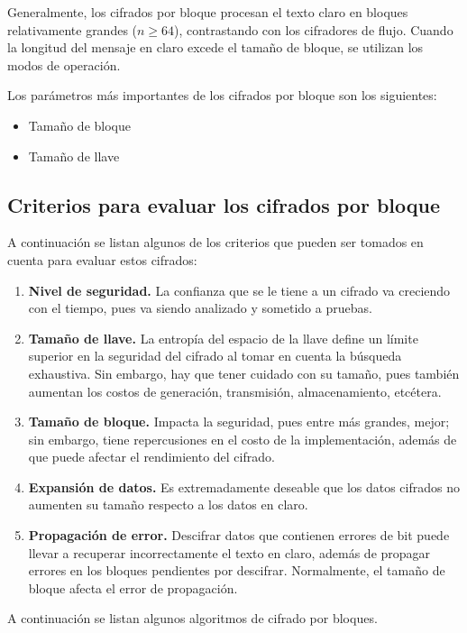 Generalmente, los cifrados por bloque procesan el texto claro en bloques
relativamente grandes ($n \geq 64$), contrastando con los cifradores de
flujo. Cuando la longitud del mensaje en claro excede el tamaño de
bloque, se utilizan los modos de operación.

Los parámetros más importantes de los cifrados por bloque son los
siguientes:
\begin{itemize}
	\item Tamaño de bloque
	\item Tamaño de llave
\end{itemize}

\subsection{Criterios para evaluar los cifrados por bloque}

A continuación se listan algunos de los criterios que pueden ser tomados en cuenta para evaluar estos cifrados:
\begin{enumerate}
	\item \textbf{Nivel de seguridad.} La confianza que se le tiene a un
		cifrado va creciendo con el tiempo, pues va siendo analizado y
		sometido a pruebas.
	\item \textbf{Tamaño de llave.} La entropía del espacio de la llave
		define un límite superior en la seguridad del cifrado al tomar en
		cuenta la búsqueda exhaustiva. Sin embargo, hay que tener cuidado
		con su tamaño, pues también aumentan los costos de generación,
		transmisión, almacenamiento, etcétera.
	\item \textbf{Tamaño de bloque.} Impacta la seguridad, pues entre más
		grandes, mejor; sin embargo, tiene repercusiones en el costo de la
		implementación, además de que puede afectar el rendimiento del
		cifrado.
	\item \textbf{Expansión de datos.} Es extremadamente deseable que los
		datos cifrados no aumenten su tamaño respecto a los datos en claro.
	\item \textbf{Propagación de error.} Descifrar datos que contienen
		errores de bit puede llevar a recuperar incorrectamente el texto en
		claro, además de propagar errores en los bloques pendientes por
		descifrar. Normalmente, el tamaño de bloque afecta el error de
		propagación.
\end{enumerate}

A continuación se listan algunos algoritmos de cifrado por bloques.








